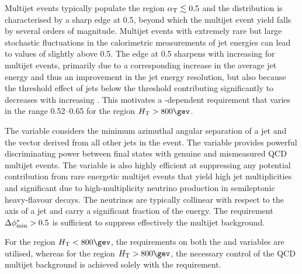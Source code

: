 Multijet events typically populate the region $\alpha_{\text{T}} \lesssim 0.5$
and the \alphat distribution is characterised by a sharp edge at 0.5,
beyond which the multijet event yield falls by several orders of
magnitude. Multijet events with extremely rare but large stochastic
fluctuations in the calorimetric measurements of jet energies can lead
to values of \alphat slightly above 0.5. The edge at 0.5 sharpens with
increasing \scalht for multijet events, primarily due to a
corresponding increase in the average jet energy and thus an
improvement in the jet energy resolution, but also because the
threshold effect of jets below the \Pt threshold contributing
significantly to \mht decreases with increasing \scalht. This
motivates a \scalht-dependent \alphat requirement that varies in the
range 0.52--0.65 for the region $\scalht > 800\gev$. 

The \dphi variable considers the minimum azimuthal angular separation
of a jet and the \mht vector derived from all other jets in the
event. The \dphi variable provides powerful discriminating power
between final states with genuine \ptvecmiss and mismeasured QCD multijet
events. The variable is also highly efficient at suppressing any
potential contribution from rare energetic multijet events that yield
high jet multiplicities and significant \ETmiss due to
high-multiplicity neutrino production in semileptonic heavy-flavour
decays. The neutrinos are typically collinear with respect to the axis
of a jet and carry a significant fraction of the energy. The
requirement $\Delta\phi^{*}_{\rm min} > 0.5$ is sufficient to suppress effectively the
multijet background.

For the region $\scalht < 800\gev$, the requirements on both the
\alphat and \dphi variables are utilised, whereas for the region
$\scalht > 800\gev$, the necessary control of the QCD multijet
background is achieved solely with the \dphi requirement. 


